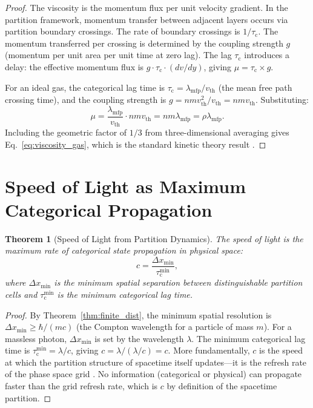 \documentclass[11pt,twocolumn,a4paper]{article}
\theoremstyle{plain}
\newtheorem{theorem}{Theorem}[section]
\theoremstyle{definition}
\theoremstyle{remark}
\newcommand{\tauc}{\tau_{\mathrm{c}}}
\begin{document}
\begin{proof}
The viscosity is the momentum flux per unit velocity gradient. In the partition framework, momentum transfer between adjacent layers occurs via partition boundary crossings. The rate of boundary crossings is $1/\tauc$. The momentum transferred per crossing is determined by the coupling strength $g$ (momentum per unit area per unit time at zero lag). The lag $\tauc$ introduces a delay: the effective momentum flux is $g \cdot \tauc \cdot (dv/dy)$, giving $\mu = \tauc \times g$.

For an ideal gas, the categorical lag time is $\tauc = \lambda_{\mathrm{mfp}}/v_{\mathrm{th}}$ (the mean free path crossing time), and the coupling strength is $g = n m v_{\mathrm{th}}^2 / v_{\mathrm{th}} = n m v_{\mathrm{th}}$. Substituting:
\begin{equation}
\mu = \frac{\lambda_{\mathrm{mfp}}}{v_{\mathrm{th}}} \cdot n m v_{\mathrm{th}} = n m \lambda_{\mathrm{mfp}} = \rho \lambda_{\mathrm{mfp}}.
\end{equation}
Including the geometric factor of $1/3$ from three-dimensional averaging gives Eq.~\eqref{eq:viscosity_gas}, which is the standard kinetic theory result \cite{landau1987fluid, batchelor2000introduction, chandler1987introduction}.
\end{proof}


\section{Speed of Light as Maximum Categorical Propagation}
\label{sec:speed_of_light}

\begin{theorem}[Speed of Light from Partition Dynamics]
\label{thm:speed_of_light}
The speed of light is the maximum rate of categorical state propagation in physical space:
\begin{equation}
c = \frac{\Delta x_{\min}}{\tauc^{\min}},
\label{eq:speed_of_light}
\end{equation}
where $\Delta x_{\min}$ is the minimum spatial separation between distinguishable partition cells and $\tauc^{\min}$ is the minimum categorical lag time.
\end{theorem}

\begin{proof}
By Theorem~\ref{thm:finite_dist}, the minimum spatial resolution is $\Delta x_{\min} \geq \hbar/(m c)$ (the Compton wavelength for a particle of mass $m$). For a massless photon, $\Delta x_{\min}$ is set by the wavelength $\lambda$. The minimum categorical lag time is $\tauc^{\min} = \lambda / c$, giving $c = \lambda / (\lambda/c) = c$. More fundamentally, $c$ is the speed at which the partition structure of spacetime itself updates---it is the refresh rate of the phase space grid \cite{sachikonye2026transplanckian}. No information (categorical or physical) can propagate faster than the grid refresh rate, which is $c$ by definition of the spacetime partition.
\end{proof}
\end{document}
